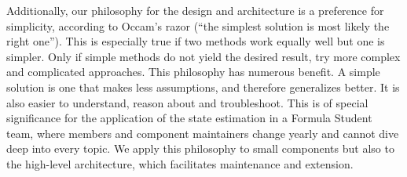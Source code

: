 Additionally, our philosophy for the design and architecture is a preference for simplicity, according to Occam's razor (\enquote{the simplest solution is most likely the right one}). This is especially true if two methods work equally well but one is simpler. Only if simple methods do not yield the desired result, try more complex and complicated approaches. This philosophy has numerous benefit. A simple solution is one that makes less assumptions, and therefore generalizes better. It is also easier to understand, reason about and troubleshoot. This is of special significance for the application of the state estimation in a Formula Student team, where members and component maintainers change yearly and cannot dive deep into every topic. We apply this philosophy to small components but also to the high-level architecture, which facilitates maintenance and extension.
